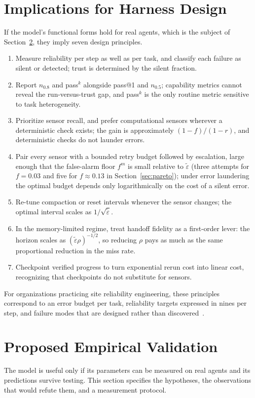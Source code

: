 \documentclass[journal]{IEEEtran}
\newcommand{\et}{\tilde{\varepsilon}}
\begin{document}
\section{Implications for Harness Design}\label{sec:implications}
If the model's functional forms hold for real agents, which is the subject of Section~\ref{sec:program}, they imply seven design principles.
\begin{enumerate}
  \item Measure reliability per step as well as per task, and classify each failure as silent or detected; trust is determined by the silent fraction.
  \item Report $n_{0.8}$ and pass$^k$ alongside pass@1 and $n_{0.5}$; capability metrics cannot reveal the run-versus-trust gap, and pass$^k$ is the only routine metric sensitive to task heterogeneity.
  \item Prioritize sensor recall, and prefer computational sensors wherever a deterministic check exists; the gain is approximately $(1-f)/(1-r)$, and deterministic checks do not launder errors.
  \item Pair every sensor with a bounded retry budget followed by escalation, large enough that the false-alarm floor $f^m$ is small relative to $\et$ (three attempts for $f=0.03$ and five for $f\approx0.13$ in Section~\ref{sec:pareto}); under error laundering the optimal budget depends only logarithmically on the cost of a silent error.
  \item Re-tune compaction or reset intervals whenever the sensor changes; the optimal interval scales as $1/\sqrt{\et}$.
  \item In the memory-limited regime, treat handoff fidelity as a first-order lever: the horizon scales as $(\et\rho)^{-1/2}$, so reducing $\rho$ pays as much as the same proportional reduction in the miss rate.
  \item Checkpoint verified progress to turn exponential rerun cost into linear cost, recognizing that checkpoints do not substitute for sensors.
\end{enumerate}
For organizations practicing site reliability engineering, these principles correspond to an error budget per task, reliability targets expressed in nines per step, and failure modes that are designed rather than discovered~\cite{beyer2016}.

\section{Proposed Empirical Validation}\label{sec:program}
The model is useful only if its parameters can be measured on real agents and its predictions survive testing. This section specifies the hypotheses, the observations that would refute them, and a measurement protocol.
\end{document}
